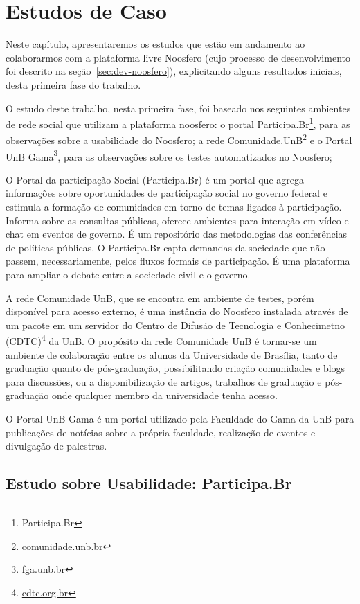 \chapter{Estudos de Caso}

Neste capítulo, apresentaremos os estudos que estão em andamento ao colaborarmos com a plataforma livre Noosfero (cujo processo de desenvolvimento foi descrito na seção~\ref{sec:dev-noosfero}), explicitando alguns resultados iniciais, desta primeira fase do trabalho.

O estudo deste trabalho, nesta primeira fase, foi baseado nos seguintes ambientes de
rede social que utilizam a plataforma noosfero:
%
o portal Participa.Br\footnote{Participa.Br}, para as observações sobre a usabilidade do Noosfero;
%
a rede Comunidade.UnB\footnote{comunidade.unb.br} e o Portal UnB Gama\footnote{fga.unb.br}, para as observações sobre os testes automatizados no Noosfero;
%

O Portal da participação Social (Participa.Br) é um portal que agrega informações sobre oportunidades de participação social no governo federal e estimula a formação de comunidades em torno de temas ligados à participação.
%
Informa sobre as consultas públicas, oferece ambientes para interação em vídeo e chat em eventos de governo. É um repositório das metodologias das conferências de políticas públicas. O Participa.Br capta demandas da sociedade que não passem, necessariamente, pelos fluxos formais de participação. É uma plataforma para ampliar o debate entre a sociedade civil e o governo.

A rede Comunidade UnB, que se encontra em ambiente de testes, porém disponível para acesso externo, é uma instância do Noosfero instalada através de um pacote em um servidor do Centro de Difusão de Tecnologia e Conhecimetno (CDTC)\footnote{\url{cdtc.org.br}} da UnB. O propósito da rede Comunidade UnB é tornar-se um ambiente de colaboração entre os alunos da Universidade de Brasília, tanto de graduação quanto de pós-graduação, possibilitando criação comunidades e blogs para discussões, ou a disponibilização de artigos, trabalhos de graduação e pós-graduação onde qualquer membro da universidade tenha acesso.

O Portal UnB Gama é um portal utilizado pela Faculdade do Gama da UnB para publicações de notícias sobre a própria faculdade, realização de eventos e divulgação de palestras.

\section {Estudo sobre Usabilidade: Participa.Br}


